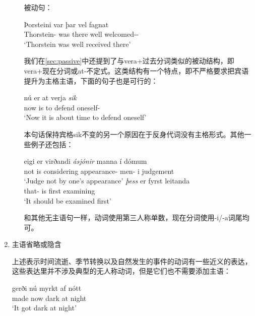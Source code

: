 \begin{enumerate}
\begin{enumerate}
                    被动句：
                    \begin{exe}
                        \ex \gll
                        Þorsteini	var	þar	vel	fagnat\\
                        Thorstein-{\dat}	was	there	well	welcomed-{\neu}-{\nom}\\
                        \trans `Thorstein was well received there’
                    \end{exe}

                    我们在\ref{sec:passive}中还提到了与vera+过去分词类似的被动结构，即vera+现在分词或at-不定式。这类结构有一个特点，即不严格要求把宾语提升为主格主语，下面的句子也是可行的：
                    \begin{exe}
                        \ex \gll
                        nú	er	at	verja	\textit{sik}\\
                        now	is	to	defend	oneself-{\acc}\\
                        \trans `Now it is about time to defend oneself’
                    \end{exe}

                    本句话保持宾格sik不变的另一个原因在于反身代词没有主格形式。其他一些例子还包括：
                    \begin{exe}
                        \ex \gll
                        eigi	er	virðandi	\textit{ásjónir}	manna	í	dómum\\
                        not	is	considering	appearance-{\acc}	men-{\gen}	i	judgement\\
                        \trans `Judge not by one’s appearance’
                        \ex \gll
                        \textit{þess}	er	fyrst	leitanda\\
                        that-{\gen}	is	first	examining\\
                        \trans `It should be examined first’
                    \end{exe}

                    和其他无主语句一样，动词使用第三人称单数，现在分词使用-i/-a词尾均可。
          \end{enumerate}

    \item 主语省略或隐含

          上述表示时间流逝、季节转换以及自然发生的事件的动词有一些近义的表达，这些表达里并不涉及典型的无人称动词，但是它们也不需要添加主语：
          \begin{exe}
              \ex \gll
              gerði	nú	myrkt	af	nótt\\
              made	now	dark	at	night\\
              \trans `It got dark at night’
          \end{exe}


\end{enumerate}
